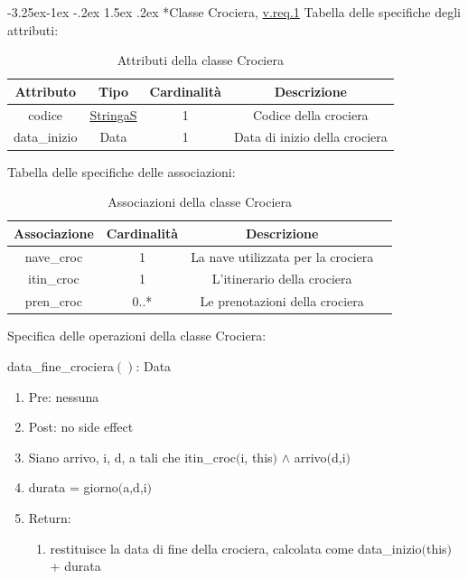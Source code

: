 \documentclass{article}
\makeatletter
\renewcommand\subsection{\@startsection{subsection}{2}{\z@}%
                                     {-3.25ex\@plus -1ex \@minus -.2ex}%
                                     {1.5ex \@plus .2ex}%
                                     {\normalfont\normalsize\bfseries}}
\makeatother
\begin{document}
\subsection*{Classe Crociera, \hyperref[sec:RequisitiCrociera]{v.req.1}}\label{sec:Crociera}
Tabella delle specifiche degli attributi:
\begin{table}[h!]
    \centering
    \begin{tabular}{|c|c|c|c|}
        \hline
        Attributo & Tipo & Cardinalità & Descrizione \\
        \hline
        codice & \hyperref[sec:StringaS]{StringaS} & 1 & Codice della crociera \\
        data\_inizio & Data & 1 & Data di inizio della crociera \\
        \hline
    \end{tabular}
    \caption{Attributi della classe Crociera}
\end{table}

Tabella delle specifiche delle associazioni:
\begin{table}[h!]
    \centering
    \begin{tabular}{|c|c|c|c|}
        \hline
        Associazione & Cardinalità & Descrizione \\
        \hline
        nave\_croc & 1 & La nave utilizzata per la crociera \\
        itin\_croc & 1 & L'itinerario della crociera \\
        pren\_croc & 0..* & Le prenotazioni della crociera \\
        \hline
    \end{tabular}
    \caption{Associazioni della classe Crociera}
\end{table}

Specifica delle operazioni della classe Crociera:

data\_fine\_crociera$()$: Data
\begin{enumerate}
    \item Pre: nessuna
    \item Post: no side effect
    \item Siano arrivo, i, d, a tali che itin\_croc$($i, this$)$ $\land$ arrivo$($d,i$)$
    \item durata = giorno$($a,d,i$)$
    \item Return:
    \begin{enumerate}
        \item restituisce la data di fine della crociera, calcolata come data\_inizio$($this$)$ + durata
    \end{enumerate}
\end{enumerate}
\end{document}
